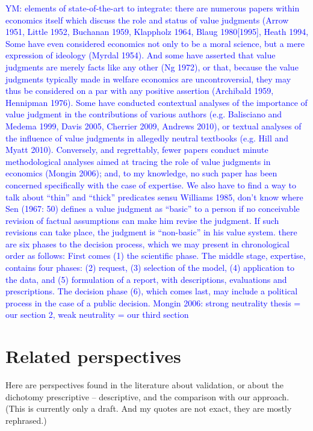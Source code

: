 \documentclass[preprint, french, english, 11pt, authoryear]{elsarticle}%
\newcommand{\commentYM}[1]{\textcolor{blue}{YM: #1}}
\begin{document}
\commentYM{elements of state-of-the-art to integrate: there are numerous papers within economics itself
which discuss the role and status of value judgments (Arrow 1951, Little 1952,
Buchanan 1959, Klappholz 1964, Blaug 1980[1995], Heath 1994, Some have
even considered economics not only to be a moral science, but a mere expression
of ideology (Myrdal 1954). And some have asserted that value judgments
are merely facts like any other (Ng 1972), or that, because the value judgments
typically made in welfare economics are uncontroversial, they may thus be considered
on a par with any positive assertion (Archibald 1959, Hennipman 1976).
Some have conducted contextual analyses of the importance of value judgment
in the contributions of various authors (e.g. Balisciano and Medema 1999, Davis
2005, Cherrier 2009, Andrews 2010), or textual analyses of the influence of value
judgments in allegedly neutral textbooks (e.g. Hill and Myatt 2010). Conversely,
and regrettably, fewer papers conduct minute methodological analyses aimed at
tracing the role of value judgments in economics (Mongin 2006); and, to my
knowledge, no such paper has been concerned specifically with the case of expertise.
We also have to find a way to talk about ``thin'' and ``thick'' predicates sensu Williams 1985, don't know where
Sen (1967: 50) defines a value judgment
as “basic” to a person if no conceivable revision of factual assumptions can
make him revise the judgment. If such revisions can take place, the judgment is
“non-basic” in his value system.
there are six phases to the decision
process, which we may present in chronological order as follows: First comes
(1) the scientific phase. The middle stage, expertise, contains four phases: (2) request,
(3) selection of the model, (4) application to the data, and (5) formulation of
a report, with descriptions, evaluations and prescriptions. The decision phase (6),
which comes last, may include a political process in the case of a public decision.
Mongin 2006: strong neutrality thesis = our section 2, weak neutrality = our third section}

\section{Related perspectives}
\label{sec-related}
Here are perspectives found in the literature about validation, or about the dichotomy prescriptive – descriptive, and the comparison with our approach. (This is currently only a draft. And my quotes are not exact, they are mostly rephrased.)
\end{document}
